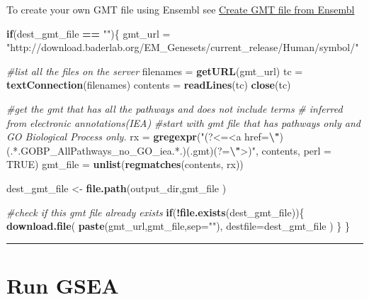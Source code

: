 \documentclass[
]{book}
\newenvironment{Shaded}{\begin{snugshade}}{\end{snugshade}}
\newcommand{\AttributeTok}[1]{\textcolor[rgb]{0.13,0.29,0.53}{#1}}
\newcommand{\CommentTok}[1]{\textcolor[rgb]{0.56,0.35,0.01}{\textit{#1}}}
\newcommand{\ConstantTok}[1]{\textcolor[rgb]{0.56,0.35,0.01}{#1}}
\newcommand{\ControlFlowTok}[1]{\textcolor[rgb]{0.13,0.29,0.53}{\textbf{#1}}}
\newcommand{\FunctionTok}[1]{\textcolor[rgb]{0.13,0.29,0.53}{\textbf{#1}}}
\newcommand{\NormalTok}[1]{#1}
\newcommand{\OtherTok}[1]{\textcolor[rgb]{0.56,0.35,0.01}{#1}}
\newcommand{\SpecialCharTok}[1]{\textcolor[rgb]{0.81,0.36,0.00}{\textbf{#1}}}
\newcommand{\StringTok}[1]{\textcolor[rgb]{0.31,0.60,0.02}{#1}}
\begin{document}
To create your own GMT file using Ensembl see \protect\hyperlink{create-gmt-file-from-ensembl}{Create GMT file from Ensembl}

\begin{Shaded}
\begin{Highlighting}[]
\ControlFlowTok{if}\NormalTok{(dest\_gmt\_file }\SpecialCharTok{==} \StringTok{""}\NormalTok{)\{}
\NormalTok{  gmt\_url }\OtherTok{=} \StringTok{"http://download.baderlab.org/EM\_Genesets/current\_release/Human/symbol/"}
  
  \CommentTok{\#list all the files on the server}
\NormalTok{  filenames }\OtherTok{=} \FunctionTok{getURL}\NormalTok{(gmt\_url)}
\NormalTok{  tc }\OtherTok{=} \FunctionTok{textConnection}\NormalTok{(filenames)}
\NormalTok{  contents }\OtherTok{=} \FunctionTok{readLines}\NormalTok{(tc)}
  \FunctionTok{close}\NormalTok{(tc)}
  
  \CommentTok{\#get the gmt that has all the pathways and does not include terms }
  \CommentTok{\# inferred from electronic annotations(IEA)}
  \CommentTok{\#start with gmt file that has pathways only and GO Biological Process only.}
\NormalTok{  rx }\OtherTok{=} \FunctionTok{gregexpr}\NormalTok{(}\StringTok{"(?\textless{}=\textless{}a href=}\SpecialCharTok{\textbackslash{}"}\StringTok{)(.*.GOBP\_AllPathways\_no\_GO\_iea.*.)(.gmt)(?=}\SpecialCharTok{\textbackslash{}"}\StringTok{\textgreater{})"}\NormalTok{,}
\NormalTok{    contents, }\AttributeTok{perl =} \ConstantTok{TRUE}\NormalTok{)}
\NormalTok{  gmt\_file }\OtherTok{=} \FunctionTok{unlist}\NormalTok{(}\FunctionTok{regmatches}\NormalTok{(contents, rx))}
  
\NormalTok{  dest\_gmt\_file }\OtherTok{\textless{}{-}} \FunctionTok{file.path}\NormalTok{(output\_dir,gmt\_file )}
  
  \CommentTok{\#check if this gmt file already exists}
  \ControlFlowTok{if}\NormalTok{(}\SpecialCharTok{!}\FunctionTok{file.exists}\NormalTok{(dest\_gmt\_file))\{}
    \FunctionTok{download.file}\NormalTok{(}
      \FunctionTok{paste}\NormalTok{(gmt\_url,gmt\_file,}\AttributeTok{sep=}\StringTok{""}\NormalTok{),}
      \AttributeTok{destfile=}\NormalTok{dest\_gmt\_file}
\NormalTok{    )}
\NormalTok{  \}}
\NormalTok{\}}
\end{Highlighting}
\end{Shaded}

\begin{center}\rule{0.5\linewidth}{0.5pt}\end{center}

\hypertarget{run-gsea}{%
\section{Run GSEA}\label{run-gsea}}
\end{document}
